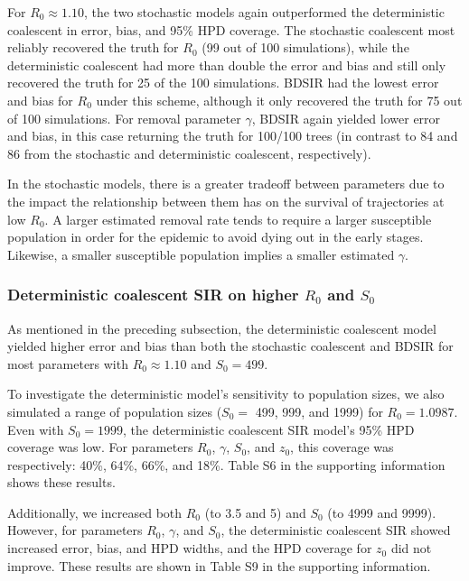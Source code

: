 \documentclass[12pt,titlepage]{article}
\newcommand{\deterCoalSIR}{deterministic coalescent SIR}
\newcommand{\BDSIR}{BDSIR}
\begin{document}
For $R_{0}\approx1.10$, the two stochastic models again outperformed the deterministic coalescent in error, bias, and 95\% HPD coverage.  
The stochastic coalescent most reliably recovered the truth for $R_0$ (99 out of 100 simulations), while the deterministic coalescent had more than double the error and bias and 
still only recovered the truth for 25 of the 100 simulations.  
\BDSIR{} had the lowest error and bias for $R_0$ under this scheme, although it only recovered the truth for 75 out of 100 simulations.
For removal parameter $\gamma$, \BDSIR{} again yielded lower error and bias, in this case returning the truth for 100/100 trees (in contrast to 84 and 86 from the stochastic and deterministic coalescent, respectively).

In the stochastic models, there 
is a greater tradeoff between parameters due to the impact the relationship between them has on the survival of trajectories at low $R_0$.  
A larger estimated removal rate tends to require a larger susceptible population in order for the epidemic to avoid dying out in the early 
stages.  Likewise, a smaller susceptible population implies a smaller estimated $\gamma$.


\subsubsection{Deterministic coalescent SIR on higher $R_0$ and $S_0$}  As mentioned in the preceding subsection, 
the deterministic coalescent model yielded higher error and bias than both the stochastic coalescent and \BDSIR{} for most parameters with $R_{0} \approx 1.10$ and $S_{0}=499$.  

To investigate the deterministic model's sensitivity to population sizes, we also simulated a range of population sizes ($S_{0}=$ 499, 999, and 1999) for $R_{0}=1.0987$.  
Even with $S_{0}=1999$, the \deterCoalSIR{} model's 95\% HPD coverage was low.  For parameters $R_0$, $\gamma$, $S_0$, and $z_0$, 
this coverage was respectively: 40\%, 64\%, 66\%, and 18\%.  Table S6 in the supporting information shows these results.  

Additionally, we increased both $R_0$ (to 3.5 and 5) and $S_0$ (to 4999 and 9999).  However, for parameters $R_0$, $\gamma$, and $S_0$, the \deterCoalSIR{} showed increased error, bias, and HPD widths, 
and the HPD coverage for $z_0$ did not improve.  These results are shown in Table S9 in the supporting information.
\end{document}
